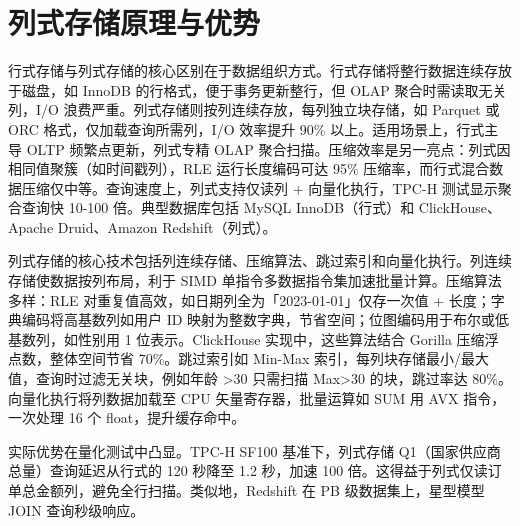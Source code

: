 \chapter{列式存储原理与优势}
行式存储与列式存储的核心区别在于数据组织方式。行式存储将整行数据连续存放于磁盘，如 InnoDB 的行格式，便于事务更新整行，但 OLAP 聚合时需读取无关列，I/O 浪费严重。列式存储则按列连续存放，每列独立块存储，如 Parquet 或 ORC 格式，仅加载查询所需列，I/O 效率提升 90\%{} 以上。适用场景上，行式主导 OLTP 频繁点更新，列式专精 OLAP 聚合扫描。压缩效率是另一亮点：列式因相同值聚簇（如时间戳列），RLE 运行长度编码可达 95\%{} 压缩率，而行式混合数据压缩仅中等。查询速度上，列式支持仅读列 + 向量化执行，TPC-H 测试显示聚合查询快 10-100 倍。典型数据库包括 MySQL InnoDB（行式）和 ClickHouse、Apache Druid、Amazon Redshift（列式）。\par
列式存储的核心技术包括列连续存储、压缩算法、跳过索引和向量化执行。列连续存储使数据按列布局，利于 SIMD 单指令多数据指令集加速批量计算。压缩算法多样：RLE 对重复值高效，如日期列全为「2023-01-01」仅存一次值 + 长度；字典编码将高基数列如用户 ID 映射为整数字典，节省空间；位图编码用于布尔或低基数列，如性别用 1 位表示。ClickHouse 实现中，这些算法结合 Gorilla 压缩浮点数，整体空间节省 70\%{}。跳过索引如 Min-Max 索引，每列块存储最小/最大值，查询时过滤无关块，例如年龄 >30 只需扫描 Max>30 的块，跳过率达 80\%{}。向量化执行将列数据加载至 CPU 矢量寄存器，批量运算如 SUM 用 AVX 指令，一次处理 16 个 float，提升缓存命中。\par
实际优势在量化测试中凸显。TPC-H SF100 基准下，列式存储 Q1（国家供应商总量）查询延迟从行式的 120 秒降至 1.2 秒，加速 100 倍。这得益于列式仅读订单总金额列，避免全行扫描。类似地，Redshift 在 PB 级数据集上，星型模型 JOIN 查询秒级响应。\par
